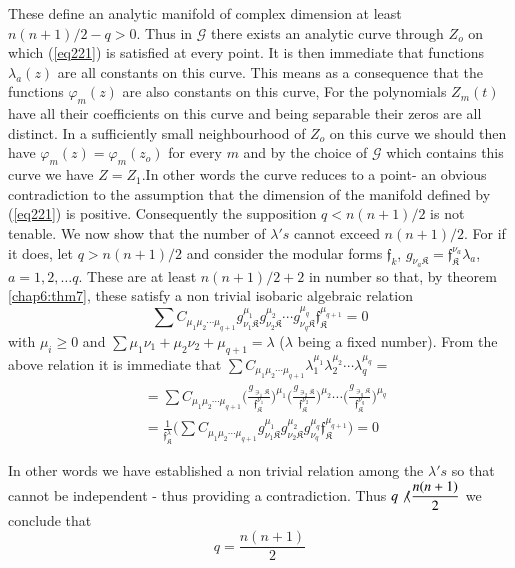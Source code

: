 These define an analytic manifold of complex dimension at least $n(n +
1)/ 2 - q > 0$. Thus in $\mathscr{G}$ there exists an analytic curve through
$Z_o$ on which (\ref{eq221}) is satisfied at  every point. It is then
immediate that functions $\lambda_a (z)$ are all constants on this
curve. This means as a consequence that the functions $\varphi_m (z)$
are also constants on this curve, For the polynomials $Z_m (t)$ have
all their coefficients on this curve and being separable their zeros
are all distinct. In a sufficiently small neighbourhood of $Z_o$ on
this curve we should then have $\varphi _m (z) = \varphi_m (z_o)$ for
every $m$ and by the choice of $\mathscr{G}$ which\pageoriginale
contains this curve we have $Z =Z_1$.In other words the curve reduces
to a point- an obvious contradiction to the assumption that the
dimension of the manifold defined by (\ref{eq221}) is
positive. Consequently the supposition $q < n (n + 1)/2$ is  not
tenable. We now show that the number of $\lambda 's$ cannot exceed $n
(n+1)/2$. For if it does, let $q > n (n+1)/2$ and consider the modular
forms $\mathfrak{f}_k$, $g_{\nu_a \mathfrak{K}} =
\mathfrak{f}^{\nu_a}_\mathfrak{K} \lambda_a$, $a = 1,2, \ldots
q$. These are at least $n (n+1)/2+2$ in number so that, by theorem
\ref{chap6:thm7}, these satisfy a  non trivial isobaric algebraic
relation   
$$
\sum C_{\mu_1 \mu_2 \cdots \mu_{q+1}} g^{\mu_{1} }_{\nu_{1} \mathfrak{K}}
g_{\nu_2 \mathfrak{K}}^{\mu_{2}} \cdots g^{\mu_q}_{\nu_{q} \mathfrak{K}}
\mathfrak{f}^{\mu_{q +1}}_{\mathfrak{K}} =0  
$$
with $\mu_i \geq 0$ and $\sum \mu_1 \nu_1 + \mu_2 \nu_2 + \mu_{q+1} =
\lambda$ ($\lambda$ being a fixed number). From the above relation it
is immediate that $\sum C_{\mu_1 \mu_2 \cdots \mu_{q+1}}
\lambda_1^{\mu_1} \lambda_2^{\mu_2}\cdots \lambda_q ^{\mu_q} =$ 
\begin{align*}
& = \sum C_{\mu_1 \mu_2 \cdots \mu_{q+1}} \bigg ( \frac{g_{\ni_1
      \mathfrak{K}}}{\mathfrak{f}^{\nu_1}_\mathfrak{K}} \bigg )^{\mu_1} \bigg (
  \frac{g_{\ni_2 \mathfrak{K}}}{\mathfrak{f}^{\nu_2}_\mathfrak{K}} \bigg )^{\mu_2} \cdots
  \bigg ( \frac{g_{\ni_q \mathfrak{K}}}{\mathfrak{f}^{\nu_q}_\mathfrak{K}} \bigg
  )^{\mu_q}\\ 
& = \frac{1}{\mathfrak{f}_{\mathfrak{K}}^{\lambda}} \bigg ( \sum C_{\mu_1 \mu_2
    \cdots \mu_{q+1}}  g_{\nu_{1} \mathfrak{K}}^{\mu_{1}} g_{\nu_2 \mathfrak{K}}^{\mu_2}
  g_{\nu_q }^{\mu_q} \mathfrak{f}_\mathfrak{K} ^{\mu_{q +1}}\bigg ) =0  
\end{align*}

In other words we have established a non trivial relation among the
$\lambda 's$ so that cannot be independent - thus providing a
contradiction. Thus $q \not \langle \dfrac{n(n+1)}{2}$ we conclude
that 
$$
q = \frac{n (n +1)}{2}
$$

